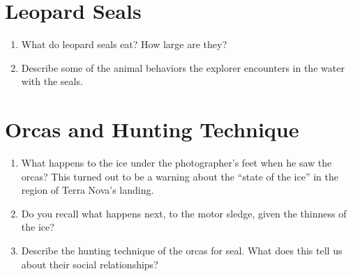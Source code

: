 \documentclass{article}
\begin{document}
\section{Leopard Seals}

\begin{enumerate}
\item What do leopard seals eat?  How large are they? \\ \vspace{1cm}
\item Describe some of the animal behaviors the explorer encounters in the water with the seals. \\ \vspace{2cm}
\end{enumerate}

\section{Orcas and Hunting Technique}

\begin{enumerate}
\item What happens to the ice under the photographer's feet when he saw the orcas?  This turned out to be a warning about the ``state of the ice'' in the region of Terra Nova's landing. \\ \vspace{1cm}
\item Do you recall what happens next, to the motor sledge, given the thinness of the ice? \\ \vspace{1cm}
\item Describe the hunting technique of the orcas for seal.  What does this tell us about their social relationships?  \\ \vspace{1cm}
\end{enumerate}
\end{document}
